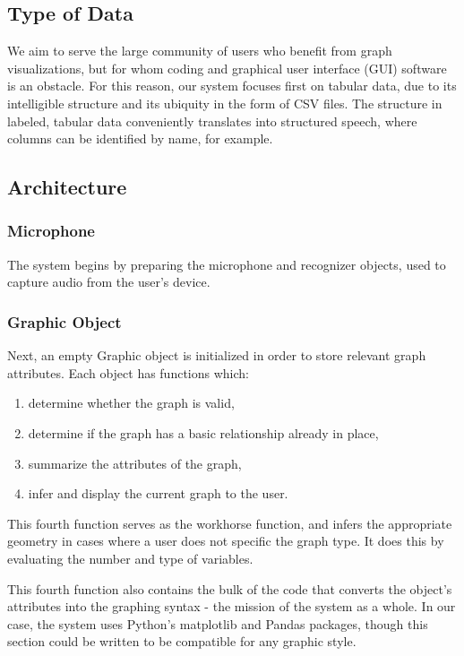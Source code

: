\documentclass[11pt]{article}
\begin{document}
\subsection{Type of Data}
We aim to serve the large community of users who benefit from graph visualizations, but for whom coding and graphical user interface (GUI) software is an obstacle. For this reason, our system focuses first on tabular data, due to its intelligible structure and its ubiquity in the form of CSV files. The structure in labeled, tabular data conveniently translates into structured speech, where columns can be identified by name, for example.



\subsection{Architecture}

\subsubsection{Microphone}
The system begins by preparing the microphone and recognizer objects, used to capture audio from the user's device.

\subsubsection{Graphic Object}
Next, an empty Graphic object is initialized in order to store relevant graph attributes. Each object has functions which:
\begin{enumerate}[i]
\item determine whether the graph is valid,
\item determine if the graph has a basic relationship already in place,
\item summarize the attributes of the graph,
\item infer and display the current graph to the user.
\end{enumerate}
This fourth function serves as the workhorse function, and infers the appropriate geometry in cases where a user does not specific the graph type. It does this by evaluating the number and type of variables. 

This fourth function also contains the bulk of the code that converts the object's attributes into the graphing syntax - the mission of the system as a whole. In our case, the system uses Python's matplotlib and Pandas packages, though this section could be written to be compatible for any graphic style.
\end{document}
